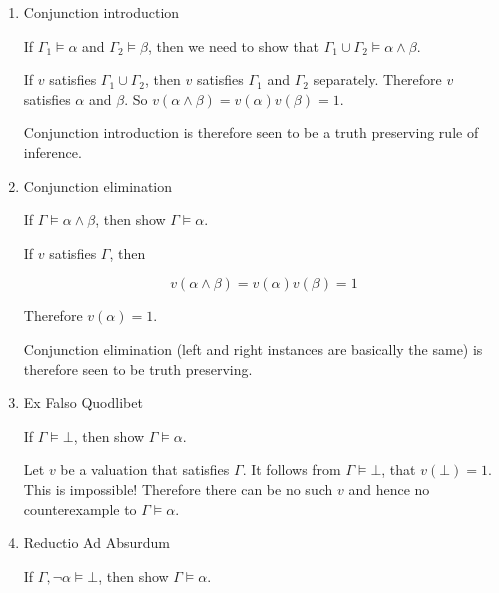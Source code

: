 \documentclass[11pt]{report}
\begin{document}
\begin{enumerate}
\begin{enumerate}
			\vspace{0.2cm}

			\item Conjunction introduction
			
			If $\Gamma_{1} \models \alpha$ and $\Gamma_{2} \models \beta$, then we need to show that $\Gamma_{1} \cup \Gamma_{2} \models \alpha \land \beta$. 

			\hspace{0.2cm}{\bf Solution}

			If $v$ satisfies $\Gamma_{1} \cup \Gamma_{2}$, then $v$ satisfies $\Gamma_{1}$ and $\Gamma_{2}$ separately. Therefore $v$ satisfies $\alpha$ and $\beta$. So $v(\alpha \land \beta) = v(\alpha)v(\beta)=1$.
			
			Conjunction introduction is therefore seen to be a truth preserving rule of inference.  
			
			\vspace{0.2cm}

			\item Conjunction elimination
			
			If $\Gamma \models \alpha \land \beta$, then show $\Gamma \models \alpha$.

			\hspace{0.2cm}{\bf Solution}

			If $v$ satisfies $\Gamma$, then 
			
			$$v(\alpha \land \beta) = v(\alpha)v(\beta) = 1$$

			Therefore $v(\alpha) = 1$. 
			
			Conjunction elimination (left and right instances are basically the same) is therefore seen to be truth preserving. 

			\vspace{0.2cm}

			\item Ex Falso Quodlibet
			
			If $\Gamma \models \bot$, then show $\Gamma \models \alpha$.

			\hspace{0.2cm}{\bf Solution}

			Let $v$ be a valuation that satisfies $\Gamma$. It follows from $\Gamma \models \bot$, that $v(\bot) = 1$. This is impossible! Therefore there can be no such $v$ and hence no counterexample to $\Gamma \models \alpha$.
			
			\item Reductio Ad Absurdum
			
			If $\Gamma, \lnot \alpha \models \bot$, then show $\Gamma \models \alpha$.


\end{enumerate}
\end{enumerate}
\end{document}
